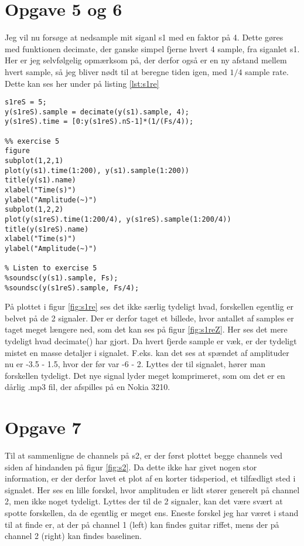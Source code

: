 \documentclass[../main.tex]{subfiles}
\begin{document}
\section{Opgave 5 og 6}

Jeg vil nu forsøge at nedsample mit siganl s1 med en faktor på 4. Dette gøres med funktionen decimate, der ganske simpel fjerne hvert 4 sample, fra siganlet s1. Her er jeg selvfølgelig opmærksom på, der derfor også er en ny afstand mellem hvert sample, så jeg bliver nødt til at beregne tiden igen, med \( 1 / 4 \) sample rate. Dette kan ses her under på listing \ref{lst:s1re} 

\begin{lstlisting}[caption={Nedsampel af s1}, label={lst:s1re}]
s1reS = 5;
y(s1reS).sample = decimate(y(s1).sample, 4);
y(s1reS).time = [0:y(s1reS).nS-1]*(1/(Fs/4));

%% exercise 5
figure
subplot(1,2,1)
plot(y(s1).time(1:200), y(s1).sample(1:200))
title(y(s1).name)
xlabel("Time(s)")
ylabel("Amplitude(~)")
subplot(1,2,2)
plot(y(s1reS).time(1:200/4), y(s1reS).sample(1:200/4))
title(y(s1reS).name)
xlabel("Time(s)")
ylabel("Amplitude(~)")

% Listen to exercise 5
%soundsc(y(s1).sample, Fs);
%soundsc(y(s1reS).sample, Fs/4);
\end{lstlisting}


På plottet i figur \ref{fig:s1re} ses det ikke særlig tydeligt hvad, forskellen egentlig er belvet på de 2 signaler. Der er derfor taget et billede, hvor antallet af samples er taget meget længere ned, som det kan ses på figur \ref{fig:s1reZ}. Her ses det mere tydeligt hvad decimate() har gjort. Da hvert fjerde sample er væk, er der tydeligt mistet en masse detaljer i signalet. F.eks. kan det ses at spændet af amplituder nu er -3.5 - 1.5, hvor der før var -6 - 2. Lyttes der til signalet, hører man forskellen tydeligt. Det nye signal lyder meget komprimeret, som om det er en dårlig .mp3 fil, der afspilles på en Nokia 3210. 



\section{Opgave 7}

Til at sammenligne de channels på s2, er der først plottet begge channels ved siden af hindanden på figur \ref{fig:s2}. Da dette ikke har givet nogen stor information, er der derfor lavet et plot af en korter tidsperiod, et tilfædligt sted i signalet. Her ses en lille forskel, hvor amplituden er lidt stører generelt på channel 2, men ikke noget tydeligt. Lyttes der til de 2 signaler, kan det være svært at spotte forskellen, da de egentlig er meget ens. Eneste forskel jeg har været i stand til at finde er, at der på channel 1 (left) kan findes guitar riffet, mens der på channel 2 (right) kan findes baselinen. 
\end{document}
